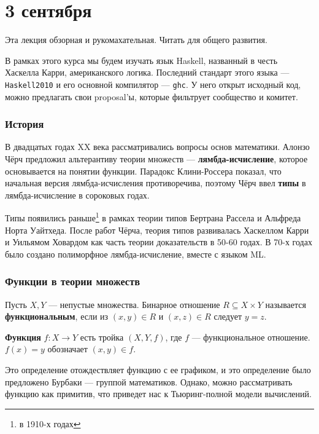 \chapter{3 сентября}

Эта лекция обзорная и рукомахательная. Читать для общего развития.

В рамках этого курса мы будем изучать язык Haskell, названный в честь Хаскелла Карри, американского логика. Последний стандарт этого языка --- \texttt{Haskell2010} и его основной компилятор --- \texttt{ghc}. У него открыт исходный код, можно предлагать свои proposal'ы, которые фильтрует сообщество и комитет.

\subsection{История}

В двадцатых годах XX века рассматривались вопросы основ математики. Алонзо Чёрч предложил альтерантиву теории множеств --- \textbf{лямбда-исчисление}, которое основывается на понятии функции. Парадокс Клини-Россера показал, что начальная версия лямбда-исчисления противоречива, поэтому Чёрч ввел \textbf{типы} в лямбда-исчисление в сороковых годах.

Типы появились раньше\footnote{в 1910-х годах} в рамках теории типов Бертрана Рассела и Альфреда Норта Уайтхеда. После работ Чёрча, теория типов развивалась Хаскеллом Карри и Уильямом Ховардом как часть теории доказательств в 50-60 годах. В 70-х годах было создано полиморфное лямбда-исчисление, вместе с языком ML.

\subsection{Функции в теории множеств}

\begin{definition}
    Пусть \(X, Y\) --- непустые множества. Бинарное отношение \(R \subseteq X \times Y\) называется \textbf{функциональным}, если из \((x, y) \in R\) и \((x, z) \in R\) следует \(y = z\).
\end{definition}

\begin{definition}
    \textbf{Функция} \(f : X \to Y\) есть тройка \((X, Y, f)\), где \(f\) --- функциональное отношение. \(f(x) = y\) обозначает \((x, y) \in f\).
\end{definition}

Это определение отождествляет функцию с ее графиком, и это определение было предложено Бурбаки --- группой математиков. Однако, можно рассматривать функцию как примитив, что приведет нас к Тьюринг-полной модели вычислений.


